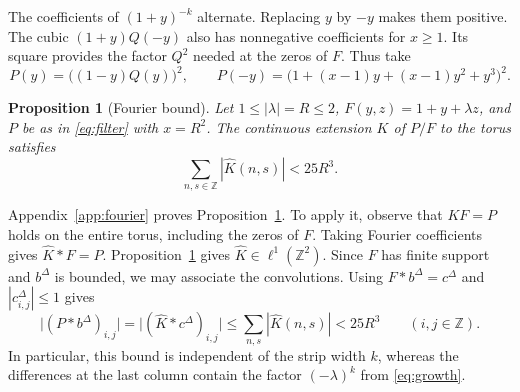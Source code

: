 \documentclass[11pt,reqno]{amsart}
\newtheorem{proposition}[theorem]{Proposition}
\begin{document}
The coefficients of \((1+y)^{-k}\) alternate. Replacing \(y\) by \(-y\) makes them positive. The cubic \((1+y)Q(-y)\) also has nonnegative coefficients for \(x\ge1\). Its square provides the factor \(Q^2\) needed at the zeros of \(F\). Thus take
\begin{equation}\label{eq:filter}
 P(y)=\big((1-y)Q(y)\big)^2,\qquad
 P(-y)=\big(1+(x-1)y+(x-1)y^2+y^3\big)^2 .
\end{equation}

\begin{proposition}[Fourier bound]\label{prop:kernel}
Let \(1\le|\lambda|=R\le2\), \(F(y,z)=1+y+\lambda z\), and \(P\) be as in \eqref{eq:filter} with \(x=R^2\). The continuous extension \(K\) of \(P/F\) to the torus satisfies
\[
 \sum_{n,s\in\mathbb Z}|\widehat K(n,s)|<25R^3.
\]
\end{proposition}

Appendix~\ref{app:fourier} proves Proposition~\ref{prop:kernel}. To apply it, observe that \(KF=P\) holds on the entire torus, including the zeros of \(F\). Taking Fourier coefficients gives \(\widehat K*F=P\). Proposition~\ref{prop:kernel} gives \(\widehat K\in\ell^1(\mathbb Z^2)\). Since \(F\) has finite support and \(b^\Delta\) is bounded, we may associate the convolutions. Using \(F*b^\Delta=c^\Delta\) and \(|c^\Delta_{i,j}|\le1\) gives
\begin{equation}\label{eq:bound}
 \big|(P*b^\Delta)_{i,j}\big|=\big|(\widehat K*c^\Delta)_{i,j}\big|\le\sum_{n,s}|\widehat K(n,s)|<25R^3
 \qquad (i,j\in\mathbb Z).
\end{equation}
In particular, this bound is independent of the strip width \(k\), whereas the differences at the last column contain the factor \((-\lambda)^k\) from \eqref{eq:growth}.
\end{document}
